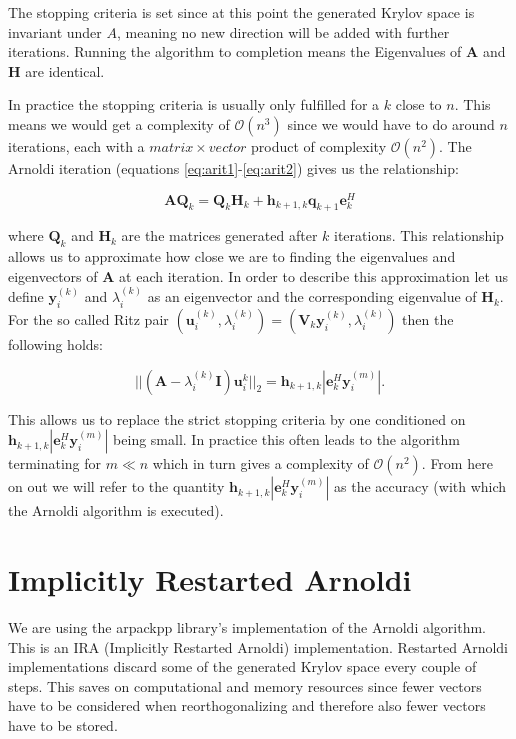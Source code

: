 \documentclass[a4paper, oneside]{thirdparty_stylesheets/discothesis}
\begin{document}
The stopping criteria is set since at this point the generated Krylov space is invariant under $A$, meaning no new direction will be added with further iterations.
Running the algorithm to completion means the Eigenvalues of $\mathbf{A}$ and $\mathbf{H}$ are identical. 

In practice the stopping criteria is usually only fulfilled for a $k$ close to $n$.
This means we would get a complexity of $\mathcal{O}(n^3)$ since we would have to do around $n$ iterations, each with a $matrix\times vector$ product of complexity $\mathcal{O}(n^2)$.
The Arnoldi iteration (equations \ref{eq:arit1}-\ref{eq:arit2}) gives us the relationship:

\begin{equation}
	\mathbf{AQ}_k = \mathbf{Q}_k\mathbf{H}_k + \mathbf{h}_{k+1,k}\mathbf{q}_{k+1}\mathbf{e}_k^H
\end{equation}

where $\mathbf{Q}_k$ and $\mathbf{H}_k$ are the matrices generated after $k$ iterations.
This relationship allows us to approximate how close we are to finding the eigenvalues and eigenvectors of $\mathbf{A}$ at each iteration.
In order to describe this approximation let us define $\mathbf{y}_i^{(k)}$ and $\lambda_i^{(k)}$ as an eigenvector and the corresponding eigenvalue of $\mathbf{H}_k$. 
For the so called Ritz pair $(\mathbf{u}_i^{(k)},\lambda_i^{(k)})=(\mathbf{V}_k\mathbf{y}_i^{(k)},\lambda_i^{(k)})$ then the following holds:

\begin{equation}
	||(\mathbf{A}-\lambda_i^{(k)}\mathbf{I})\mathbf{u}_i^{k}||_2 = \mathbf{h}_{k+1,k} |\mathbf{e}_k^H\mathbf{y}_i^{(m)}|.	
\end{equation}

This allows us to replace the strict stopping criteria by one conditioned on $\mathbf{h}_{k+1,k} |\mathbf{e}_k^H\mathbf{y}_i^{(m)}|$ being small.
In practice this often leads to the algorithm terminating for $m \ll n$ which in turn gives a complexity of $\mathcal{O}(n^2)$. \cite{doi:10.1137/1.9781611970739.ch6} 
From here on out we will refer to the quantity $\mathbf{h}_{k+1,k} |\mathbf{e}_k^H\mathbf{y}_i^{(m)}|$ as the accuracy (with which the Arnoldi algorithm is executed).


\section{Implicitly Restarted Arnoldi}
We are using the arpackpp\cite{arpackpp} library's implementation of the Arnoldi algorithm.
This is an IRA (Implicitly Restarted Arnoldi) implementation.
Restarted Arnoldi implementations discard some of the generated Krylov space every couple of steps.
This saves on computational and memory resources since fewer vectors have to be considered when reorthogonalizing and therefore also fewer vectors have to be stored.
\end{document}
